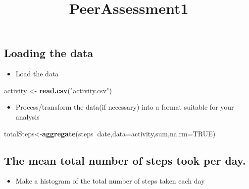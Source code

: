 \documentclass[]{article}
\title{PeerAssessment1}
\author{}
\date{}
\newenvironment{Shaded}{\begin{snugshade}}{\end{snugshade}}
\newcommand{\KeywordTok}[1]{\textcolor[rgb]{0.13,0.29,0.53}{\textbf{#1}}}
\newcommand{\DataTypeTok}[1]{\textcolor[rgb]{0.13,0.29,0.53}{#1}}
\newcommand{\StringTok}[1]{\textcolor[rgb]{0.31,0.60,0.02}{#1}}
\newcommand{\OtherTok}[1]{\textcolor[rgb]{0.56,0.35,0.01}{#1}}
\newcommand{\OperatorTok}[1]{\textcolor[rgb]{0.81,0.36,0.00}{\textbf{#1}}}
\newcommand{\NormalTok}[1]{#1}
\providecommand{\tightlist}{%
  \setlength{\itemsep}{0pt}\setlength{\parskip}{0pt}}
\begin{document}
\maketitle

\subsection{Loading the data}\label{loading-the-data}

\begin{itemize}
\tightlist
\item
  Load the data
\end{itemize}

\begin{Shaded}
\begin{Highlighting}[]
\NormalTok{activity <-}\StringTok{ }\KeywordTok{read.csv}\NormalTok{(}\StringTok{"activity.csv"}\NormalTok{)}
\end{Highlighting}
\end{Shaded}

\begin{itemize}
\tightlist
\item
  Process/transform the data(if necessary) into a format suitable for
  your analysis
\end{itemize}

\begin{Shaded}
\begin{Highlighting}[]
\NormalTok{totalSteps<-}\KeywordTok{aggregate}\NormalTok{(steps}\OperatorTok{~}\NormalTok{date,}\DataTypeTok{data=}\NormalTok{activity,sum,}\DataTypeTok{na.rm=}\OtherTok{TRUE}\NormalTok{)}
\end{Highlighting}
\end{Shaded}

\subsection{The mean total number of steps took per
day.}\label{the-mean-total-number-of-steps-took-per-day.}

\begin{itemize}
\tightlist
\item
  Make a histogram of the total number of steps taken each day
\end{itemize}

\begin{Shaded}
\end{Shaded}
\end{document}
